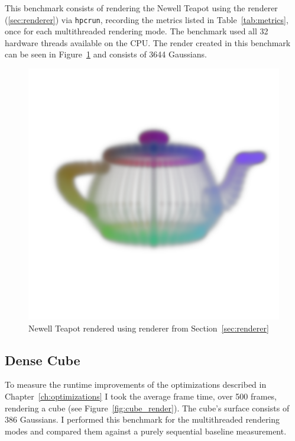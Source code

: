 \documentclass[a4paper, 11pt]{memoir}
\begin{document}
    This benchmark consists of rendering the Newell Teapot using the renderer (\ref{sec:renderer}) via \texttt{hpcrun},
    recording the metrics listed in Table~\ref{tab:metrics}, once for each multithreaded rendering mode. The benchmark
    used all 32 hardware threads available on the CPU. The render created in this benchmark can be seen in
    Figure~\ref{fig:teapot_render} and consists of 3644 Gaussians.

    \begin{figure}[t]
        \centering
        \includegraphics[scale=.2]{images/teapot.png}
        \caption{Newell Teapot rendered using renderer from Section~\ref{sec:renderer}}
        \label{fig:teapot_render}
    \end{figure}
    
    \subsection{Dense Cube}
    \label{sec:dense_cube}
    To measure the runtime improvements of the optimizations described in Chapter~\ref{ch:optimizations} I took the average
    frame time, over 500 frames, rendering a cube (see Figure~\ref{fig:cube_render}). The cube's surface consists of
    386 Gaussians. I performed this benchmark for the multithreaded rendering modes and compared them against a purely
    sequential baseline measurement.
\end{document}

